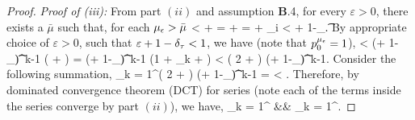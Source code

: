 \begin{proof}
	
	{\it  Proof of (iii):} From part $(ii)$ and assumption {\bf B}.4, %
	for every $\varepsilon > 0$, there exists a $\bar{\mu}$ such that, for each ${\mu_\epsilon} > \bar{\mu}$
	\beq
	 < \varepsilon +  
	= \varepsilon + 
	= \varepsilon + \rho_i
	< \varepsilon +  1-\delta_\t.
	\eeq %
	By appropriate choice of  $\varepsilon >0$, such that $\varepsilon + 1-\delta_{\tau} < 1$, we have
	(note that $p_0^{\mu_\epsilon} = 1$),
	\beq
	< (\varepsilon +  1-\delta_\t )^{k-1} \left(  + \varepsilon \right)
	= (\varepsilon +  1-\delta_\t )^{k-1} \left(1 + \rho_k + \varepsilon \right)
	< \left( 2 + \varepsilon \right) (\varepsilon + 1-\delta_\t )^{k-1}. 
	\eeq
	Consider the following summation,
	\beq
	\sum_{k = 1}^\infty \left( 2 + \varepsilon \right) (\varepsilon + 1-\delta_\t )^{k-1} =  < \infty.
	\eeq
	Therefore, by dominated convergence theorem (DCT) for series (note each of the terms inside the series converge by part $(ii)$), we have,
	\beq
	\sum_{k = 1}^\infty {} &\stackrel{\mue \to \infty}{\longrightarrow}& \sum_{k = 1}^\infty {}. 
	\eeq
	

\end{proof}
